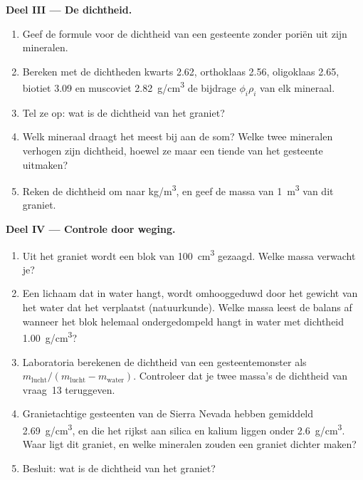 \begin{problem}
\medskip
\noindent\textbf{Deel III --- De dichtheid.}
\begin{enumerate}[resume]
  \item Geef de formule voor de dichtheid van een gesteente zonder poriën uit
        zijn mineralen.
  \item Bereken met de dichtheden kwarts \qty{2.62}{}, orthoklaas \qty{2.56}{},
        oligoklaas \qty{2.65}{}, biotiet \qty{3.09}{} en muscoviet
        \qty{2.82}{g/cm^3} de bijdrage $\phi_i \rho_i$ van
        elk mineraal.
  \item Tel ze op: wat is de dichtheid van het graniet?
  \item Welk mineraal draagt het meest bij aan de som? Welke twee mineralen
        verhogen zijn dichtheid, hoewel ze maar een tiende van het gesteente uitmaken?
  \item Reken de dichtheid om naar \unit{kg/m^3}, en geef de massa van
        \qty{1}{m^3} van dit graniet.
\end{enumerate}

\medskip
\noindent\textbf{Deel IV --- Controle door weging.}
\begin{enumerate}[resume]
  \item Uit het graniet wordt een blok van \qty{100}{cm^3} gezaagd. Welke massa
        verwacht je?
  \item Een lichaam dat in water hangt, wordt omhooggeduwd door het gewicht van het water dat het
        verplaatst (natuurkunde). Welke massa leest de balans af wanneer het blok
        helemaal ondergedompeld hangt in water met dichtheid \qty{1.00}{g/cm^3}?
  \item Laboratoria berekenen de dichtheid van een gesteentemonster als
        $m_{\text{lucht}}/(m_{\text{lucht}} - m_{\text{water}})$. Controleer dat
        je twee massa's de dichtheid van vraag~13 teruggeven.
  \item Granietachtige gesteenten van de Sierra Nevada hebben gemiddeld \qty{2.69}{g/cm^3}, en
        die het rijkst aan silica en kalium liggen onder \qty{2.6}{g/cm^3}.
        Waar ligt dit graniet, en welke mineralen zouden een
        graniet dichter maken?
  \item Besluit: wat is de dichtheid van het graniet?
\end{enumerate}
\end{problem}
